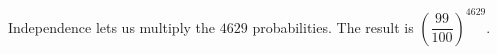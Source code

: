 Independence lets us multiply the $4629$ probabilities. The result is $\boxed{(\dfrac{99}{100})^{4629}}$.
